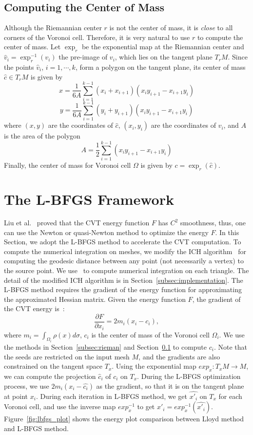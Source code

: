 \subsection{Computing the Center of Mass}\label{subsec:centerOfMass}
Although the Riemannian center $r$ is not the center of mass, it is \textit{close} to all corners of the Voronoi cell.
Therefore, it is very natural to use $r$ to compute the center of mass.
Let $\exp_{r}$ be the exponential map at the Riemannian center and $\hat{v}_i=\exp_{r}^{-1}(v_i)$ the pre-image of $v_i$, which lies on the tangent plane $T_{r}M$.
Since the points $\hat{v}_i$, $i=1,\cdots,k$, form a polygon on the tangent plane, its center of mass $\hat{c}\in T_{r}M$ is given by
$$x = \frac{1}{6A}\sum_{i=1}^{k-1}(x_i+x_{i+1})(x_i y_{i+1} - x_{i+1} y_i)$$
$$y = \frac{1}{6A}\sum_{i=1}^{k-1}(y_i+y_{i+1})(x_i y_{i+1} - x_{i+1} y_i)$$
where $(x,y)$ are the coordinates of $\hat c$, $(x_i,y_i)$ are the coordinates of $\hat{v}_i$, and $A$ is the area of the polygon
$$A = \frac{1}{2}\sum_{i=1}^{k-1}(x_i y_{i+1} - x_{i+1} y_i)  $$
Finally, the center of mass for Voronoi cell $\Omega$ is given by $c=\exp_{r}(\hat{c})$.

\section{The L-BFGS Framework}\label{sec:lbfgs}
Liu et al.~\cite{Liu:2009:CVT} proved that the CVT energy function
$F$ has $C^2$ smoothness, thus, one can use the Newton or
quasi-Newton method to optimize the energy $F$. In this Section, we
adopt the L-BFGS method to accelerate the CVT computation. To
compute the numerical integration on meshes, we modify the ICH
algorithm~\cite{Xin_Wang:2009} for computing the geodesic distance
between any point (not necessarily a vertex) to the source point. We
use~\cite{Genz:2003:ANC:838250.838254} to compute numerical
integration on each triangle. The detail of the modified ICH
algorithm is in Section~\ref{subsec:implementation}. The L-BFGS
method requires the gradient of the energy function for
approximating the approximated Hessian matrix. Given the energy
function $F$, the gradient of the
CVT energy is~\cite{iri1984fast}\cite{Du:1999:CVT:340312.340319}:
\begin{equation}
\frac{\partial F}{\partial x_i} = 2{m_i}(x_i-c_i),\nonumber
\end{equation}
where $m_i=\int_{\Omega_i}{{\rho{(x)d\sigma}}}$, $c_i$ is the center
of mass of the Voronoi cell $\Omega_i$.
 We use the methods in Section~\ref{subsec:rieman} and Section~\ref{subsec:centerOfMass} to compute $c_i$.
Note that the seeds are restricted on the input mesh $M$, and the
gradients are also constrained on the tangent space $T_x$. Using the
exponential map $exp_x: T_x M \rightarrow M$, we can compute the
projection $\hat{c}_i$ of $c_i$ on $T_x$. During the L-BFGS
optimization process, we use $2{m_i}(x_i-\hat{c_i})$ as the
gradient, so that it is on the tangent plane at point $x_i$. During
each iteration in L-BFGS method, we get $\hat{x'_i}$ on $T_x$ for
each Voronoi cell, and use the inverse map $exp_x^{-1}$ to get
$x'_i=exp_x^{-1}(\hat{x'_i})$. Figure~\ref{fig:lbfgs_plot} shows the
energy plot comparison between Lloyd method and L-BFGS method.

